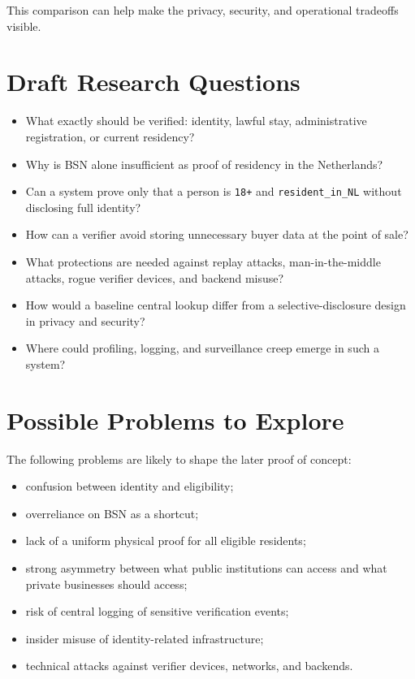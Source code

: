\documentclass[11pt,a4paper]{article}
\begin{document}
This comparison can help make the privacy, security, and operational tradeoffs visible.

\section{Draft Research Questions}

\begin{itemize}
    \item What exactly should be verified: identity, lawful stay, administrative registration, or current residency?
    \item Why is BSN alone insufficient as proof of residency in the Netherlands?
    \item Can a system prove only that a person is \texttt{18+} and \texttt{resident\_in\_NL} without disclosing full identity?
    \item How can a verifier avoid storing unnecessary buyer data at the point of sale?
    \item What protections are needed against replay attacks, man-in-the-middle attacks, rogue verifier devices, and backend misuse?
    \item How would a baseline central lookup differ from a selective-disclosure design in privacy and security?
    \item Where could profiling, logging, and surveillance creep emerge in such a system?
\end{itemize}

\section{Possible Problems to Explore}

The following problems are likely to shape the later proof of concept:

\begin{itemize}
    \item confusion between identity and eligibility;
    \item overreliance on BSN as a shortcut;
    \item lack of a uniform physical proof for all eligible residents;
    \item strong asymmetry between what public institutions can access and what private businesses should access;
    \item risk of central logging of sensitive verification events;
    \item insider misuse of identity-related infrastructure;
    \item technical attacks against verifier devices, networks, and backends.
\end{itemize}
\end{document}
